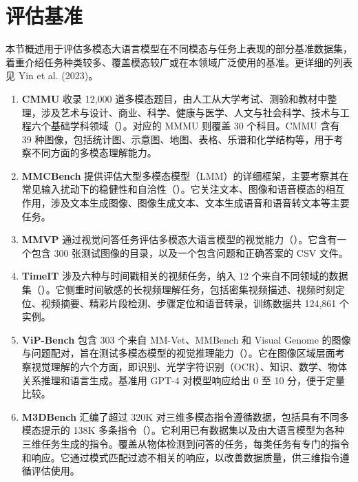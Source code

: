 \section{评估基准}
\label{sec:ch09-benchmarks}
本节概述用于评估多模态大语言模型在不同模态与任务上表现的部分基准数据集，着重介绍任务种类较多、覆盖模态较广或在本领域广泛使用的基准。更详细的列表见 Yin et al. (2023)。

\begin{enumerate}
\item \textbf{CMMU} 收录 12,000 道多模态题目，由人工从大学考试、测验和教材中整理，涉及艺术与设计、商业、科学、健康与医学、人文与社会科学、技术与工程六个基础学科领域（）。对应的 MMMU 则覆盖 30 个科目。CMMU 含有 39 种图像，包括统计图、示意图、地图、表格、乐谱和化学结构等，用于考察不同方面的多模态理解能力。

\item \textbf{MMCBench} 提供评估大型多模态模型（LMM）的详细框架，主要考察其在常见输入扰动下的稳健性和自洽性（）。它关注文本、图像和语音模态的相互作用，涉及文本生成图像、图像生成文本、文本生成语音和语音转文本等主要任务。

\item \textbf{MMVP} 通过视觉问答任务评估多模态大语言模型的视觉能力（）。它含有一个包含 300 张测试图像的目录，以及一个包含问题和正确答案的 CSV 文件。

\item \textbf{TimeIT} 涉及六种与时间戳相关的视频任务，纳入 12 个来自不同领域的数据集（）。它侧重时间敏感的长视频理解任务，包括密集视频描述、视频时刻定位、视频摘要、精彩片段检测、步骤定位和语音转录，训练数据共 124,861 个实例。

\item \textbf{ViP-Bench} 包含 303 个来自 MM-Vet、MMBench 和 Visual Genome 的图像与问题配对，旨在测试多模态模型的视觉推理能力（）。它在图像区域层面考察视觉理解的六个方面，即识别、光学字符识别（OCR）、知识、数学、物体关系推理和语言生成。基准用 GPT-4 对模型响应给出 0 至 10 分，便于定量比较。

\item \textbf{M3DBench} 汇编了超过 320K 对三维多模态指令遵循数据，包括具有不同多模态提示的 138K 多条指令（）。它利用已有数据集以及由大语言模型为各种三维任务生成的指令。覆盖从物体检测到问答的任务，每类任务有专门的指令和响应。它通过模式匹配过滤不相关的响应，以改善数据质量，供三维指令遵循评估使用。


\end{enumerate}
